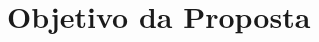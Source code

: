 \documentclass[a4paper,titlepage,12pt]{article}
\begin{document}

\newpage
\section{Objetivo da Proposta}
\label{sec:objetivo}
\end{document}

